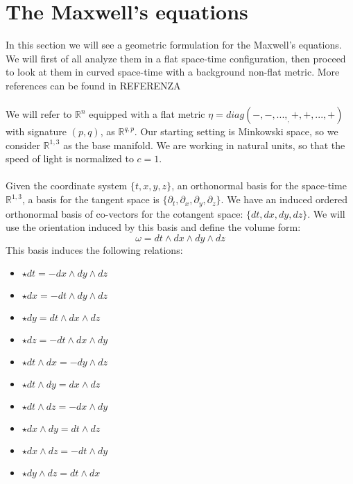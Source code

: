 \documentclass[12pt,a4paper]{report}
\theoremstyle{definition}
\theoremstyle{Theorem}
\theoremstyle{definition}
\theoremstyle{definition}
\begin{document}
	\section{The Maxwell's equations}
	In this section we will see a geometric formulation for the Maxwell's equations. We will first of all analyze them in a flat space-time configuration, then proceed to look at them in curved space-time with a background non-flat metric. More references can be found in REFERENZA\\
	\\
	We will refer to $\mathbb{R}^n$ equipped with a flat metric $\eta=diag(-,-,...,_,+,+,...,+)$ with signature $(p,q)$, as $\mathbb{R}^{q,p}$. Our starting setting is Minkowski space, so we consider $\mathbb{R}^{1,3}$ as the base manifold. We are working in natural units, so that the speed of light is normalized to $c=1$.\\
	\\
	Given the coordinate system $\{t,x,y,z\}$, an orthonormal basis for the space-time $\mathbb{R}^{1,3}$, a basis for the tangent space is $\{\partial_t,\partial_x,\partial_y,\partial_z\}$. We have an induced ordered orthonormal basis of co-vectors for the cotangent space: $\{dt,dx,dy,dz\}$. We will use the orientation induced by this basis and define the volume form:
	$$\omega=dt\wedge dx\wedge dy\wedge dz$$
	This basis induces the following relations:
	\begin{multicols}{2}
		\begin{itemize}
			\item $\star dt= -dx\wedge dy\wedge dz$
			\item $\star dx= -dt\wedge dy\wedge dz$
			\item $\star dy= dt\wedge dx\wedge dz$
			\item $\star dz=-dt\wedge dx\wedge dy$
			\item $\star dt\wedge dx=-dy\wedge dz$
		\end{itemize}
		\columnbreak
		\begin{itemize}
			\item $\star dt\wedge dy=dx\wedge dz$
			\item $\star dt\wedge dz=-dx\wedge dy$
			\item $\star dx\wedge dy=dt\wedge dz$
			\item $\star dx\wedge dz=-dt\wedge dy$
			\item $\star dy\wedge dz=dt\wedge dx$
		\end{itemize} 
	\end{multicols}
\end{document}

